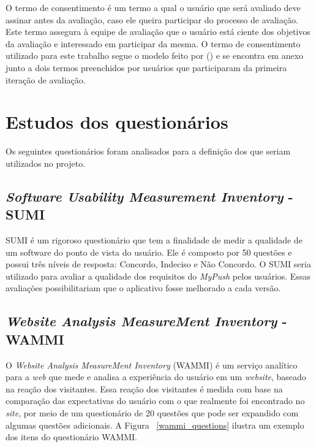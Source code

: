	O termo de consentimento é um termo a qual o usuário que será avaliado deve assinar antes da avaliação, 
	caso ele queira participar do processo de avaliação. Este termo assegura à equipe de avaliação que o usuário
	está ciente dos objetivos da avaliação e interessado em participar da mesma. O termo de consentimento utilizado
	para este trabalho segue o modelo feito por \citeauthor{termoconsentimento} (\citeyear{termoconsentimento}) e
	se encontra em anexo junto a dois termos preenchidos por usuários que participaram
	da primeira iteração de avaliação.

  \section{Estudos dos questionários}
    
    Os seguintes questionários foram analisados para a definição dos que seriam utilizados no projeto.
    
    \subsection{\textit{Software Usability Measurement Inventory} - SUMI}
      
      \nocite{summi}
      SUMI é um rigoroso questionário que tem a finalidade de medir a qualidade de um software do ponto de vista do usuário.
      Ele é composto por 50 questões e possui três níveis de resposta: Concordo, Indeciso e Não Concordo. O SUMI seria utilizado
      para avaliar a qualidade dos requisitos do \textit{MyPush} pelos usuários. Essas avaliações possibilitariam que o aplicativo fosse
      melhorado a cada versão.
      
    \subsection{\textit{Website Analysis MeasureMent Inventory} - WAMMI}
      
      \nocite{wammi}
      O \textit{Website Analysis MeasureMent Inventory} (WAMMI) é um serviço analítico para a \textit{web} que mede e analisa a experiência do
      usuário em um \textit{website}, baseado na reação dos visitantes. Essa reação dos visitantes é medida com base na comparação das
      expectativas do usuário com o que realmente foi encontrado no \textit{site}, por meio de um questionário de 20 questões que pode
      ser expandido com algumas questões adicionais. A Figura ~\ref{wammi_questions} ilustra um exemplo dos itens do questionário WAMMI.
      
